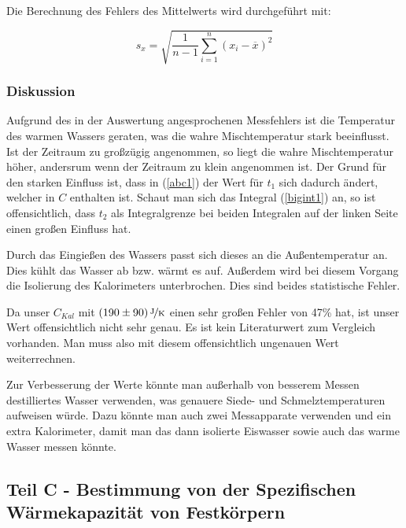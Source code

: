 \documentclass[11pt,a4paper]{article}
\begin{document}
Die Berechnung des Fehlers des Mittelwerts wird durchgef\"uhrt mit:

\begin{equation}
s_x=\sqrt{\frac{1}{n-1}\sum_{i=1}^n(x_i-\overline{x})^2}\label{uncertainty1}
\end{equation}




\subsubsection{Diskussion}

Aufgrund des in der Auswertung angesprochenen Messfehlers ist die Temperatur des warmen Wassers geraten, was die wahre Mischtemperatur stark beeinflusst. Ist der Zeitraum zu gro\ss z\"ugig angenommen, so liegt die wahre Mischtemperatur h\"oher, andersrum wenn der Zeitraum zu klein angenommen ist. Der Grund f\"ur den starken Einfluss ist, dass in (\ref{abc1}) der Wert f\"ur $t_1$ sich dadurch \"andert, welcher in $C$ enthalten ist. Schaut man sich das Integral (\ref{bigint1}) an, so ist offensichtlich, dass $t_2$ als Integralgrenze bei beiden Integralen auf der linken Seite einen gro\ss en Einfluss hat.

Durch das Eingie\ss en des Wassers passt sich dieses an die Au\ss entemperatur an. Dies k\"uhlt das Wasser ab bzw. w\"armt es auf. Au\ss erdem wird bei diesem Vorgang die Isolierung des Kalorimeters unterbrochen. Dies sind beides statistische Fehler.

Da unser $C_{Kal}$ mit $(190\pm90)\,\nicefrac{\mathrm{J}}{\mathrm{K}}$ einen sehr gro\ss en Fehler von 47\% hat, ist unser Wert offensichtlich nicht sehr genau. Es ist kein Literaturwert zum Vergleich vorhanden. Man muss also mit diesem offensichtlich ungenauen Wert weiterrechnen.

Zur Verbesserung der Werte k\"onnte man au\ss erhalb von besserem Messen destilliertes Wasser verwenden, was genauere Siede- und Schmelztemperaturen aufweisen w\"urde. Dazu k\"onnte man auch zwei Messapparate verwenden und ein extra Kalorimeter, damit man das dann isolierte Eiswasser sowie auch das warme Wasser messen k\"onnte.

\pagebreak

\subsection{Teil C - Bestimmung von der Spezifischen W\"armekapazit\"at von Festk\"orpern}
\end{document}
